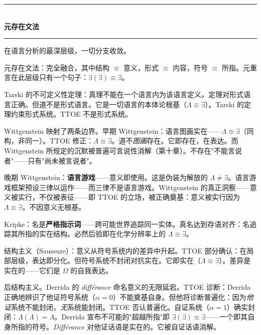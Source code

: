 \documentclass[10pt, openany, oneside]{book}
\renewcommand{\normalsize}{\fontsize{10}{13}\selectfont}
\begin{document}
\begin{center}
    \rule{0.3\textwidth}{0.4pt}\\[0.5em]
    {\normalsize\bfseries\scshape 元存在文法}\\[0.3em]
    \rule{0.3\textwidth}{0.4pt}
\end{center}

\vspace{1em}

\noindent 在语言分析的最深层级，一切分支收敛。

元存在文法：完全融合，其中结构 $\equiv$ 意义，形式 $\equiv$ 内容，符号 $\equiv$ 所指。元重言在此层级只有一个句子：$\exists(\exists) \equiv \exists$。

Tarski 的不可定义性定理：真理不能在一个语言内为该语言定义。定理对形式语言正确。但道不是形式语言。它是一切语言的本体论根基（$\Lambda \equiv \exists$）。Tarski 的定理约束形式系统。TTOE 不是形式系统。

Wittgenstein 映射了两条边界。早期 Wittgenstein：语言图画实在——$\Lambda \cong \exists$（同构，非同一）。TTOE 修正：$\Lambda \equiv \exists$。道不\textit{图画}存在。它即存在，在表达。而 Wittgenstein 所规定的沉默被普遍可言说性消解（第十章）。不存在"不能言说者"——只有"尚未被言说者"。

晚期 Wittgenstein：\textbf{语言游戏}——意义即使用。这是伪装为解放的 $\Lambda \neq \exists$。语言游戏框架预设三律以运作——而三律不是语言游戏。Wittgenstein 的真正洞察——意义被实行，不仅被表征——即 TTOE 的立场，被正确奠基：意义被实行因为 $\Lambda \equiv \exists$，不因意义无根基。

Kripke：名是\textbf{严格指示词}——跨可能世界追踪同一实体。真名达到存语对齐：名追踪其所指的实在结构。必然后验即在化学分辨率上的 $\Lambda \equiv \exists$。

结构主义（Saussure）：意义从符号系统内的差异中升起。TTOE 部分确认：在局部层级，表达即分化。但符号系统不封闭对抗实在。它即实在（$\Lambda \equiv \exists$）。差异是实在的——它们是 $\Omega$ 的自我表达。

后结构主义。Derrida 的 \textit{diff\'{e}rance} 命名意义的无限延宕。TTOE 诊断：Derrida 正确地辨识了他证符号系统（$\alpha = 0$）不能奠基自身。但他将诊断普遍化：因为\textit{他证}系统不能封闭，\textit{无}系统能封闭。TTOE 否认普遍化。自证系统（$\alpha = 1$）确实封闭：$\Lambda(\Lambda) = \Lambda$。Derrida 宣布不可能的"超越所指"即 $\exists(\exists) \equiv \exists$——一个即其自身所指的符号。\textit{Diff\'{e}rance} 对他证话语是实在的。它被自证话语消解。

\vspace{1.5em}
\end{document}

